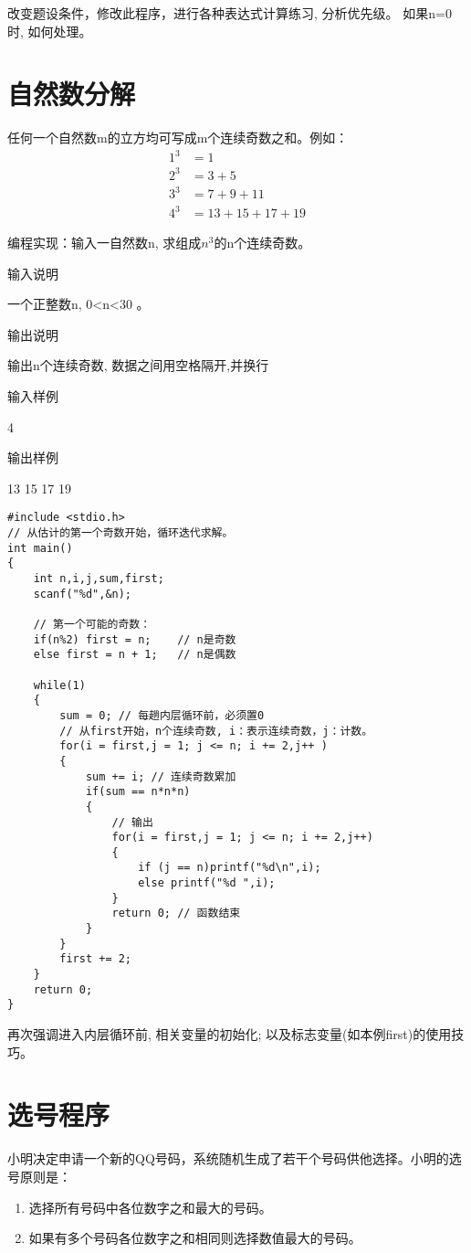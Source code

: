 \begin{note}
	改变题设条件，修改此程序，进行各种表达式计算练习, 分析优先级。 如果n=0时, 如何处理。
\end{note}


\section{自然数分解}
任何一个自然数m的立方均可写成m个连续奇数之和。例如：
\begin{align*}
1^3 &=1\\
2^3 &=3+5\\
3^3 &=7+9+11\\
4^3 &=13+15+17+19
\end{align*}

编程实现：输入一自然数n, 求组成$n^3$的n个连续奇数。

输入说明

一个正整数n, 0<n<30 。

输出说明

输出n个连续奇数, 数据之间用空格隔开,并换行

输入样例

4

输出样例

13 15 17 19

\begin{lstlisting}
#include <stdio.h>
// 从估计的第一个奇数开始，循环迭代求解。
int main()
{
	int n,i,j,sum,first;
	scanf("%d",&n);
	
	// 第一个可能的奇数：
	if(n%2) first = n;    // n是奇数 
	else first = n + 1;   // n是偶数 
	
	while(1)
	{
		sum = 0; // 每趟内层循环前，必须置0 
		// 从first开始，n个连续奇数, i：表示连续奇数，j：计数。 
		for(i = first,j = 1; j <= n; i += 2,j++ ) 
		{
			sum += i; // 连续奇数累加 
			if(sum == n*n*n) 
			{
				// 输出 
				for(i = first,j = 1; j <= n; i += 2,j++) 
				{
					if (j == n)printf("%d\n",i);
					else printf("%d ",i);
				}
				return 0; // 函数结束 
			}
		}
		first += 2; 
	}
	return 0;
} 
\end{lstlisting}

\begin{note}[要点]
	再次强调进入内层循环前, 相关变量的初始化; 以及标志变量(如本例first)的使用技巧。
\end{note}

\section{选号程序}
小明决定申请一个新的QQ号码，系统随机生成了若干个号码供他选择。小明的选号原则是：
\begin{enumerate}
	\item 选择所有号码中各位数字之和最大的号码。
	\item 如果有多个号码各位数字之和相同则选择数值最大的号码。
\end{enumerate}

